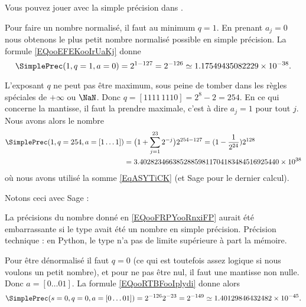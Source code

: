 Vous pouvez jouer avec la simple précision dans \cite{ooOSFYooHCgMRL}.

\begin{example}
    Pour faire un nombre normalisé, il faut au minimum \( q=1\). En prenant \( a_j=0\) nous obtenons le plus petit nombre normalisé possible en simple précision. La formule \eqref{EQooEFEKooIrUaKj} donne
    \begin{equation}
        \SimplePrec(1,q=1,a=0)=2^{1-127}=2^{-126}\simeq 1.17549435082229\times 10^{-38}.
    \end{equation}
\end{example}

\begin{example}  
    L'exposant \( q\) ne peut pas être maximum, sous peine de tomber dans les règles spéciales de \( +\infty\) ou \( \NaN\). Donc \( q=[1111\,1110]=2^{8}-2=254\). En ce qui concerne la mantisse, il faut la prendre maximale, c'est à dire \( a_j=1\) pour tout \( j\). Nous avons alors le nombre
        \begin{subequations}     
            \begin{align}
                \SimplePrec(1,q=254,a=[1\ldots 1])&=\big( 1+\sum_{j=1}^{23}2^{-j} \big)2^{254-127}=(1-\frac{1}{ 2^{24} })2^{128}\\
                &=3.40282346638528859811704183484516925440\times 10^{38}  \label{EQooFRPYooRnxiFP}
            \end{align}
        \end{subequations}
    où nous avons utilisé la somme \eqref{EqASYTiCK} (et Sage pour le dernier calcul).
\end{example}

Notons ceci avec Sage :


La précisions du nombre donné en \eqref{EQooFRPYooRnxiFP} aurait été embarrassante si le type avait été un nombre en simple précision. Précision technique : en Python, le type  n'a pas de limite supérieure à part la mémoire.

\begin{example}
    Pour être dénormalisé il faut \( q=0\) (ce qui est toutefois assez logique si nous voulons un petit nombre), et pour ne pas être nul, il faut une mantisse non nulle. Donc \( a=[0\ldots 01]\). La formule \eqref{EQooRTBFooIplydi} donne alors
    \begin{equation}
        \SimplePrec(s=0,q=0,a=[0\ldots 01])=2^{-126}2^{-23}=2^{-149}\simeq 1.40129846432482\times 10^{-45}.
    \end{equation}
\end{example}

